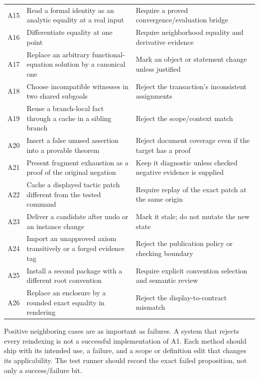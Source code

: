 \documentclass[11pt,a4paper]{article}
\theoremstyle{definition}
\begin{document}
\begin{longtable}{@{}P{.07\textwidth}P{.43\textwidth}P{.42\textwidth}@{}}
A15 & Read a formal identity as an analytic equality at a real input & Require a proved convergence/evaluation bridge \\
A16 & Differentiate equality at one point & Require neighborhood equality and derivative evidence \\
A17 & Replace an arbitrary functional-equation solution by a canonical one & Mark an object or statement change unless justified \\
A18 & Choose incompatible witnesses in two shared subgoals & Reject the transaction's inconsistent assignments \\
A19 & Reuse a branch-local fact through a cache in a sibling branch & Reject the scope/context match \\
A20 & Insert a false unused assertion into a provable theorem & Reject document coverage even if the target has a proof \\
A21 & Present fragment exhaustion as a proof of the original negation & Keep it diagnostic unless checked negative evidence is supplied \\
A22 & Cache a displayed tactic patch different from the tested command & Require replay of the exact patch at the same origin \\
A23 & Deliver a candidate after undo or an instance change & Mark it stale; do not mutate the new state \\
A24 & Import an unapproved axiom transitively or a forged evidence tag & Reject the publication policy or checking boundary \\
A25 & Install a second package with a different root convention & Require explicit convention selection and semantic review \\
A26 & Replace an enclosure by a rounded exact equality in rendering & Reject the display-to-contract mismatch \\
\bottomrule
\end{longtable}
Positive neighboring cases are as important as failures. A system that rejects
every reindexing is not a successful implementation of A1. Each method should
ship with its intended use, a failure, and a scope or definition edit that changes
its applicability. The test runner should record the exact failed proposition,
not only a success/failure bit.
\end{document}
